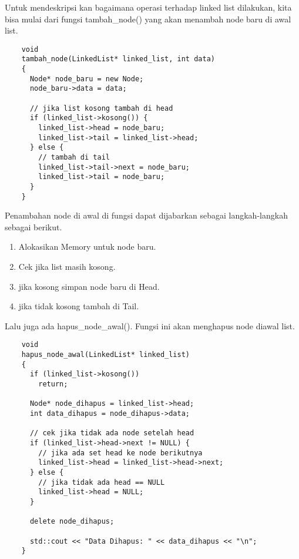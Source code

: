 \documentclass[12pt, a4paper]{article}
\begin{document}
  Untuk mendeskripsi kan bagaimana operasi terhadap linked list dilakukan, kita bisa
  mulai dari fungsi tambah\_node() yang akan menambah node baru di awal list.

  \vspace{0.5cm}
  \begin{lstlisting}
    void
    tambah_node(LinkedList* linked_list, int data)
    {
      Node* node_baru = new Node;
      node_baru->data = data;

      // jika list kosong tambah di head
      if (linked_list->kosong()) {
        linked_list->head = node_baru;
        linked_list->tail = linked_list->head;
      } else {
        // tambah di tail
        linked_list->tail->next = node_baru;
        linked_list->tail = node_baru;
      }
    }
  \end{lstlisting}
  \vspace{0.5cm}

  Penambahan node di awal di fungsi dapat dijabarkan sebagai langkah-langkah
  sebagai berikut.

  \begin{enumerate}

    \item Alokasikan Memory untuk node baru.
    \item Cek jika list masih kosong.
    \item jika kosong simpan node baru di Head.
    \item jika tidak kosong tambah di Tail.
  \end{enumerate}

  Lalu juga ada hapus\_node\_awal(). Fungsi ini akan menghapus node diawal list.

  \vspace{0.5cm}
  \begin{lstlisting}
    void
    hapus_node_awal(LinkedList* linked_list)
    {
      if (linked_list->kosong())
        return;

      Node* node_dihapus = linked_list->head;
      int data_dihapus = node_dihapus->data;

      // cek jika tidak ada node setelah head
      if (linked_list->head->next != NULL) {
        // jika ada set head ke node berikutnya
        linked_list->head = linked_list->head->next;
      } else {
        // jika tidak ada head == NULL
        linked_list->head = NULL;
      }

      delete node_dihapus;

      std::cout << "Data Dihapus: " << data_dihapus << "\n";
    }
  \end{lstlisting}
  \vspace{0.5cm}
\end{document}
